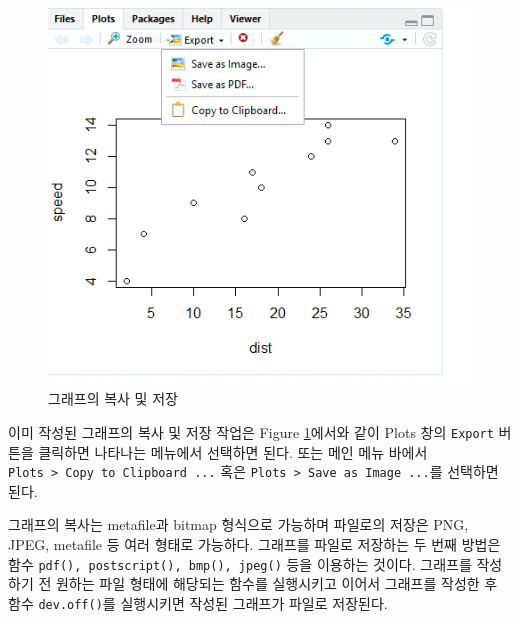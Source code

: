 \documentclass[
]{book}
\begin{document}
\begin{figure}
\includegraphics[width=6.61in]{Figure/save_graphic} \caption{그래프의 복사 및 저장}\label{fig:save-graphic}
\end{figure}

이미 작성된 그래프의 복사 및 저장 작업은 Figure
\ref{fig:save-graphic}에서와 같이 Plots 창의 \texttt{Export} 버튼을 클릭하면
나타나는 메뉴에서 선택하면 된다. 또는 메인 메뉴 바에서
\texttt{Plots\ \textgreater{}\ Copy\ to\ Clipboard\ ...} 혹은 \texttt{Plots\ \textgreater{}\ Save\ as\ Image\ ...}를
선택하면 된다.

그래프의 복사는 metafile과 bitmap 형식으로 가능하며 파일로의 저장은 PNG,
JPEG, metafile 등 여러 형태로 가능하다. 그래프를 파일로 저장하는 두 번째
방법은 함수 \texttt{pdf(),\ postscript(),\ bmp(),\ jpeg()} 등을 이용하는 것이다.
그래프를 작성하기 전 원하는 파일 형태에 해당되는 함수를 실행시키고
이어서 그래프를 작성한 후 함수 \texttt{dev.off()}를 실행시키면 작성된 그래프가
파일로 저장된다.
\end{document}
